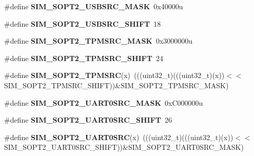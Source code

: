 \begin{DoxyCompactItemize}
\#define {\bfseries S\+I\+M\+\_\+\+S\+O\+P\+T2\+\_\+\+U\+S\+B\+S\+R\+C\+\_\+\+M\+A\+SK}~0x40000u
\item 
\mbox{\label{group___s_i_m___register___masks_ga2a455b7e86f26185c92961e139d13a89}} 
\#define {\bfseries S\+I\+M\+\_\+\+S\+O\+P\+T2\+\_\+\+U\+S\+B\+S\+R\+C\+\_\+\+S\+H\+I\+FT}~18
\item 
\mbox{\label{group___s_i_m___register___masks_gab515715932139549d30bb4b6f3e2dc99}} 
\#define {\bfseries S\+I\+M\+\_\+\+S\+O\+P\+T2\+\_\+\+T\+P\+M\+S\+R\+C\+\_\+\+M\+A\+SK}~0x3000000u
\item 
\mbox{\label{group___s_i_m___register___masks_gac70dc9abda7a707019da3d8fed90a265}} 
\#define {\bfseries S\+I\+M\+\_\+\+S\+O\+P\+T2\+\_\+\+T\+P\+M\+S\+R\+C\+\_\+\+S\+H\+I\+FT}~24
\item 
\mbox{\label{group___s_i_m___register___masks_gae3feae3d7da32c0a46d155fdfdf8d4da}} 
\#define {\bfseries S\+I\+M\+\_\+\+S\+O\+P\+T2\+\_\+\+T\+P\+M\+S\+RC}(x)~(((uint32\+\_\+t)(((uint32\+\_\+t)(x))$<$$<$S\+I\+M\+\_\+\+S\+O\+P\+T2\+\_\+\+T\+P\+M\+S\+R\+C\+\_\+\+S\+H\+I\+FT))\&S\+I\+M\+\_\+\+S\+O\+P\+T2\+\_\+\+T\+P\+M\+S\+R\+C\+\_\+\+M\+A\+SK)
\item 
\mbox{\label{group___s_i_m___register___masks_ga9527f6a7148fe172b12a87e0b3b92492}} 
\#define {\bfseries S\+I\+M\+\_\+\+S\+O\+P\+T2\+\_\+\+U\+A\+R\+T0\+S\+R\+C\+\_\+\+M\+A\+SK}~0x\+C000000u
\item 
\mbox{\label{group___s_i_m___register___masks_ga0790a9307dcaad17166308eb2f1b62df}} 
\#define {\bfseries S\+I\+M\+\_\+\+S\+O\+P\+T2\+\_\+\+U\+A\+R\+T0\+S\+R\+C\+\_\+\+S\+H\+I\+FT}~26
\item 
\mbox{\label{group___s_i_m___register___masks_ga37a051e2761f563083fe3c82234f04ca}} 
\#define {\bfseries S\+I\+M\+\_\+\+S\+O\+P\+T2\+\_\+\+U\+A\+R\+T0\+S\+RC}(x)~(((uint32\+\_\+t)(((uint32\+\_\+t)(x))$<$$<$S\+I\+M\+\_\+\+S\+O\+P\+T2\+\_\+\+U\+A\+R\+T0\+S\+R\+C\+\_\+\+S\+H\+I\+FT))\&S\+I\+M\+\_\+\+S\+O\+P\+T2\+\_\+\+U\+A\+R\+T0\+S\+R\+C\+\_\+\+M\+A\+SK)
\item 

\end{DoxyCompactItemize}
